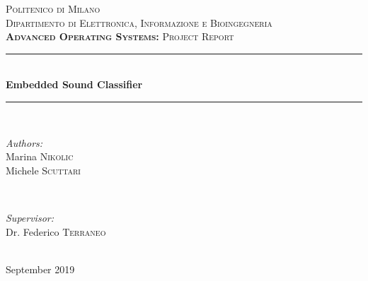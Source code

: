 \documentclass[12pt]{article}
\begin{document}

\begin{titlepage}
\center


\textsc{\LARGE Politenico di Milano}\\[1cm]
\textsc{\Large Dipartimento di Elettronica, Informazione e Bioingegneria}\\[0.5cm]
\textsc{\large \textbf{Advanced Operating Systems:} Project Report}\\[1.5cm]


\rule{\linewidth}{0.5mm} \\[0.4cm]
\vspace*{10pt}
{ \LARGE \bfseries Embedded Sound Classifier}\\[0.4cm]
\rule{\linewidth}{0.5mm} \\[1.5cm]


\begin{minipage}[t]{0.4\textwidth}
\begin{flushleft} \large
\emph{Authors:}\\
Marina \textsc{Nikolic}\\
Michele \textsc{Scuttari}
\end{flushleft}
\end{minipage}
~
\begin{minipage}[t]{0.4\textwidth}
\begin{flushright} \large
\emph{Supervisor:} \\
Dr. Federico \textsc{Terraneo}
\end{flushright}
\end{minipage}\\[1.5cm]


{\large September 2019}\\[1.5cm]



\end{titlepage}
\end{document}
